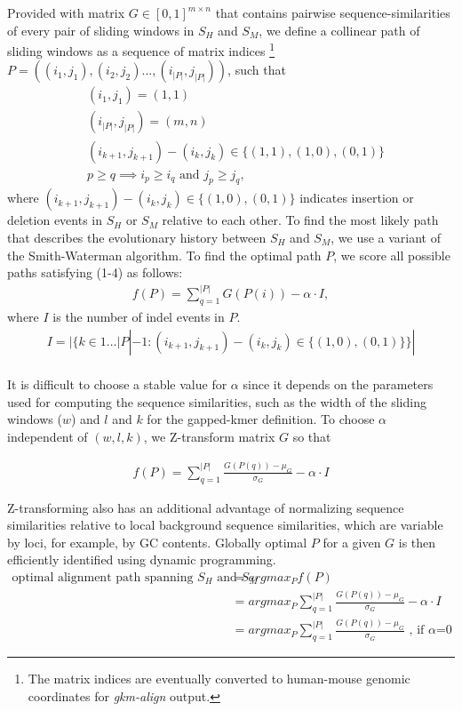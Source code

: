 \documentclass[english]{article}
\begin{document}
Provided with matrix $G\in [0,1]^{m \times n}$ that contains pairwise sequence-similarities of every pair of sliding windows in $S_H$ and $S_M$, we define a collinear path of sliding windows as a sequence of matrix indices \footnote{The matrix indices are eventually converted to human-mouse genomic coordinates for \textit{gkm-align} output.} $P = ((i_1, j_1), (i_2, j_2)\dots, (i_{|P|}, j_{|P|}))$, such that
\begin{align}
    &(i_1, j_1) = (1,1) \\
    &(i_{|P|}, j_{|P|}) = (m,n) \\
    & (i_{k+1}, j_{k+1}) - (i_k, j_k) \in \{(1,1), (1,0), (0,1)\} \\
    & p\geq q \implies i_p \geq i_q \text{ and } j_p \geq j_q,
\end{align}
where $(i_{k+1}, j_{k+1}) - (i_k, j_k) \in \{(1,0), (0,1)\}$ indicates insertion or deletion events in $S_H$ or $S_M$ relative to each other.
To find the most likely path that describes the evolutionary history between $S_H$ and $S_M$, we use a variant of the Smith-Waterman algorithm. To find the optimal path $P$, we score all possible paths satisfying (1-4) as follows:
\begin{align*}
f(P)= \sum_{q=1}^{|P|} G(P(i)) - \alpha \cdot I,
\end{align*}
where $I$ is the number of indel events in $P$.
\begin{align*}
I = |\{k\in 1\dots |P|-1: (i_{k+1},j_{k+1}) - (i_k, j_k) \in \{(1,0),(0,1)\}\}|
\end{align*}
  \\


It is difficult to choose a stable value for $\alpha$ since it depends on the parameters used for computing the sequence similarities, such as the width of the sliding windows ($w$) and $l$ and $k$ for the gapped-kmer definition. To choose $\alpha$ independent of $(w,l,k)$, we Z-transform matrix $G$ so that

 \begin{align*}
f(P)= \sum_{q=1}^{|P|} \frac{G(P(q))-\mu_G}{\sigma_G} - \alpha \cdot I \tag{Eq.8}
\end{align*}

Z-transforming also has an additional advantage of normalizing sequence similarities relative to local background sequence similarities, which are variable by loci, for example, by GC contents. Globally optimal $P$ for a given $G$ is then efficiently identified using dynamic programming. 
\begin{align*}
    \text{optimal alignment path spanning $S_H$ and $S_M$} &= argmax_P f(P) \\
    &=argmax_P \sum_{q=1}^{|P|} \frac{G(P(q))-\mu_G}{\sigma_G} - \alpha \cdot I\\
    &=argmax_P \sum_{q=1}^{|P|} \frac{G(P(q))-\mu_G}{\sigma_G} \text{  , if $\alpha$=0}
\end{align*}
\end{document}
